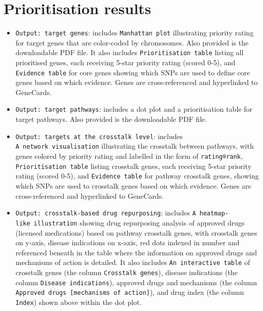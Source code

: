 \documentclass[
  oneside]{book}
\begin{document}
\hypertarget{prioritisation-results-1}{%
\section{Prioritisation results}\label{prioritisation-results-1}}

\begin{itemize}
\item
  \texttt{Output:\ target\ genes}: includes \texttt{Manhattan\ plot} illustrating priority rating for target genes that are color-coded by chromosomes. Also provided is the downloadable PDF file. It also includes \texttt{Prioritisation\ table} listing all prioritised genes, each receiving 5-star priority rating (scored 0-5), and \texttt{Evidence\ table} for core genes showing which SNPs are used to define core genes based on which evidence. Genes are cross-referenced and hyperlinked to GeneCards.
\item
  \texttt{Output:\ target\ pathways}: includes a dot plot and a prioritisation table for target pathways. Also provided is the downloadable PDF file.
\item
  \texttt{Output:\ targets\ at\ the\ crosstalk\ level}: includes \texttt{A\ network\ visualisation} illustrating the crosstalk between pathways, with genes colored by priority rating and labelled in the form of \texttt{rating®rank}, \texttt{Prioritisation\ table}
  listing crosstalk genes, each receiving 5-star priority rating (scored 0-5), and \texttt{Evidence\ table} for pathway crosstalk genes, showing which SNPs are used to crosstalk genes based on which evidence. Genes are cross-referenced and hyperlinked to GeneCards.
\item
  \texttt{Output:\ crosstalk-based\ drug\ repurposing}: includes \texttt{A\ heatmap-like\ illustration} showing drug repurposing analysis of approved drugs (licensed medications) based on pathway crosstalk genes, with crosstalk genes on y-axis, disease indications on x-axis, red dots indexed in number and referenced beneath in the table where the information on approved drugs and mechanisms of action is detailed. It also includes \texttt{An\ interactive\ table} of crosstalk genes (the column \texttt{Crosstalk\ genes}), disease indications (the column \texttt{Disease\ indications}), approved drugs and mechanisms (the column \texttt{Approved\ drugs\ {[}mechanisms\ of\ action{]}}), and drug index (the column \texttt{Index}) shown above within the dot plot.
\end{itemize}
\end{document}
